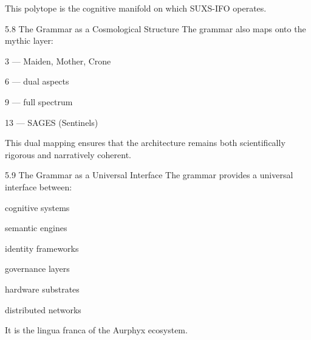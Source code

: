 This polytope is the cognitive manifold on which SUXS-IFO operates.

5.8 The Grammar as a Cosmological Structure The grammar also maps onto the mythic layer:

3 --- Maiden, Mother, Crone

6 --- dual aspects

9 --- full spectrum

13 --- SAGES (Sentinels)

This dual mapping ensures that the architecture remains both scientifically rigorous and narratively coherent.

5.9 The Grammar as a Universal Interface The grammar provides a universal interface between:

cognitive systems

semantic engines

identity frameworks

governance layers

hardware substrates

distributed networks

It is the lingua franca of the Aurphyx ecosystem.
